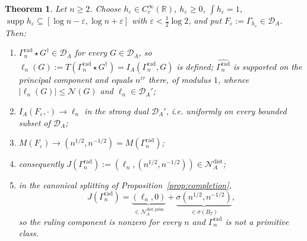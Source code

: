\documentclass[11pt]{amsart}
\newtheorem{theorem}{Theorem}[section]
\theoremstyle{definition}
\theoremstyle{remark}
\newcommand{\R}{\mathbb R}
\newcommand{\supp}{\operatorname{supp}}
\newcommand{\DA}{\mathcal D_A}
\begin{document}
\begin{theorem}\label{thm:radincompletion}
Let $n\ge2$. Choose $h_\varepsilon\in C_c^\infty(\R)$, $h_\varepsilon\ge0$,
$\int h_\varepsilon=1$, $\supp h_\varepsilon\subseteq[\log n-\varepsilon,
\log n+\varepsilon]$ with $\varepsilon<\tfrac12\log2$, and put
$F_\varepsilon:=\Gamma_{h_\varepsilon}\in\DA$. Then:
\begin{enumerate}
\item[(i)] $\Gamma_n^{\mathrm{rad}}\star G^\dagger\in\DA$ for every
$G\in\DA$, so $\ell_n(G):=T(\Gamma_n^{\mathrm{rad}}\star G^\dagger)
=I_A(\Gamma_n^{\mathrm{rad}},G)$ is defined;
$\widehat{\Gamma_n^{\mathrm{rad}}}$ is supported on the principal component
and equals $n^{i\tau}$ there, of modulus $1$, whence
$|\ell_n(G)|\le\mathcal N(G)$ and $\ell_n\in\DA'$;
\item[(ii)] $I_A(F_\varepsilon,\cdot)\to\ell_n$ in the strong dual $\DA'$,
i.e. uniformly on every bounded subset of $\DA$;
\item[(iii)] $M(F_\varepsilon)\to(n^{1/2},n^{-1/2})
=M(\Gamma_n^{\mathrm{rad}})$;
\item[(iv)] consequently $J(\Gamma_n^{\mathrm{rad}}):=(\ell_n,
(n^{1/2},n^{-1/2}))\in\mathcal N_A^{\mathrm{dist}}$;
\item[(v)] in the canonical splitting of Proposition~\ref{prop:completion},
\[
  J(\Gamma_n^{\mathrm{rad}})=\underbrace{(\ell_n,0)}
    _{\in\mathcal N_A^{\mathrm{dist,prim}}}
   +\underbrace{\sigma(n^{1/2},n^{-1/2})}_{\in\sigma(B_T)},
\]
so the ruling component is nonzero for every $n$ and
$\Gamma_n^{\mathrm{rad}}$ is not a primitive class.
\end{enumerate}
\end{theorem}
\end{document}
